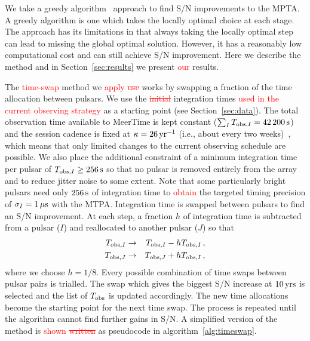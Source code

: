 \documentclass[fleqn,usenatbib]{mnras}
\newcommand{\TwoWkObsTimeS}{42\,200}
\newcommand{\change}{\textcolor{red}}
\begin{document}
We take a greedy algorithm~\citep{DechterDechter:1998} approach to find S/N improvements to the MPTA.
A greedy algorithm is one which takes the locally optimal choice at each stage. 
The approach has its limitations in that always taking the locally optimal step can lead to missing the global optimal solution. 
However, it has a reasonably low computational cost and can still achieve S/N improvement. 
Here we describe the method and in Section~\ref{sec:results} we present \change{our} results.

The \change{time-swap} method we \change{apply \st{use}} works by swapping a fraction of the time allocation between pulsars. 
We use the \change{\st{initial}} integration times \change{used in the current observing strategy} as a starting point (see Section~\ref{sec:data}).
The total observation time available to MeerTime is kept constant ($\sum_{I} T_{{\rm obs},I} = \TwoWkObsTimeS\,{\rm s}$) and the session cadence is fixed at $\kappa=26\,{\rm yr}^{-1}$ (i.e., about every two weeks)~\citep{SpiewakEtAl:2022}, which means that only limited changes to the current observing schedule are possible. 
We also place the additional constraint of a minimum integration time per pulsar of $T_{{\rm obs},I} \geq 256\,{\rm s}$ so that no pulsar is removed entirely from the array and to reduce jitter noise to some extent.
Note that some particularly bright pulsars need only $256\,{\rm s}$ of integration time to \change{obtain} the targeted timing precision of $\sigma_I = 1\,{\rm \mu s}$ with the MTPA.
Integration time is swapped between pulsars to find an S/N improvement. 
At each step, a fraction $h$ of integration time is subtracted from a pulsar ($I$) and reallocated to another pulsar ($J$) so that 
\begin{eqnarray}
T_{{\rm obs},I} &\rightarrow& T_{{\rm obs},I} - h T_{{\rm obs},I}\,, \nonumber\\
T_{{\rm obs},J} &\rightarrow& T_{{\rm obs},J} + h T_{{\rm obs},I}\,, \nonumber
\end{eqnarray}
where we choose $h=1/8$. 
Every possible combination of time swaps between pulsar pairs is trialled.
The swap which gives the biggest S/N increase at $10\,{\rm yrs}$ is selected and the list of $T_{{\rm obs}}$ is updated accordingly.
The new time allocations become the starting point for the next time swap. 
The process is repeated until the algorithm cannot find further gains in S/N. 
A simplified version of the method is \change{shown \st{written}} as pseudocode in algorithm~\ref{alg:timeswap}. 
\end{document}
